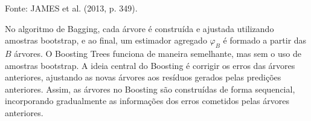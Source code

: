 \documentclass[
  12pt,
  a4paper,
]{scrreprt}
\begin{document}
\begin{algo}


\caption{\label{algo-boos}Fonte: JAMES et al. (2013, p. 349).}

\end{algo}%

No algoritmo de Bagging, cada árvore é construída e ajustada utilizando
amostras bootstrap, e ao final, um estimador agregado
\(\varphi_B\)\hspace{0pt} é formado a partir das \(B\) árvores. O
Boosting Trees funciona de maneira semelhante, mas sem o uso de amostras
bootstrap. A ideia central do Boosting é corrigir os erros das árvores
anteriores, ajustando as novas árvores aos resíduos gerados pelas
predições anteriores. Assim, as árvores no Boosting são construídas de
forma sequencial, incorporando gradualmente as informações dos erros
cometidos pelas árvores anteriores.
\end{document}
